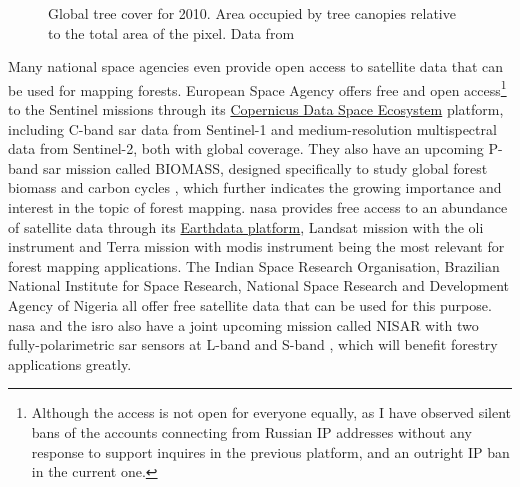 \begin{figure}
\caption[Global tree cover map]{\label{fig-forest-coverage}Global tree cover for 2010. Area occupied by tree canopies relative to the total area of the pixel. Data from \citet{hansenHighResolutionGlobalMaps2013}
}
\end{figure}

Many national space agencies even provide open access to satellite data that can be used for mapping forests.
European Space Agency offers free and open access\footnote{Although the access is not open for everyone equally, as I have observed silent bans of the accounts connecting from Russian IP addresses without any response to support inquires in the previous platform, and an outright IP ban in the current one.} to the Sentinel missions through its \href{https://dataspace.copernicus.eu/}{Copernicus Data Space Ecosystem} platform, including C-band \gls{sar} data from Sentinel-1 and medium-resolution multispectral data from Sentinel-2, both with global coverage.
They also have an upcoming P-band \gls{sar} mission called BIOMASS, designed specifically to study global forest biomass and carbon cycles \citep{queganEuropeanSpaceAgency2019}, which further indicates the growing importance and interest in the topic of forest mapping.
\gls{nasa} provides free access to an abundance of satellite data through its \href{https://www.earthdata.nasa.gov/}{Earthdata platform}, Landsat mission with the \gls{oli} instrument and Terra mission with \gls{modis} instrument being the most relevant for forest mapping applications.
The Indian Space Research Organisation, Brazilian National Institute for Space Research, National Space Research and Development Agency of Nigeria all offer free satellite data that can be used for this purpose.
\gls{nasa} and the \gls{isro} also have a joint upcoming mission called NISAR with two fully-polarimetric \gls{sar} sensors at L-band and S-band \citep{kelloggNASAISROSyntheticAperture2020}, which will benefit forestry applications greatly.

